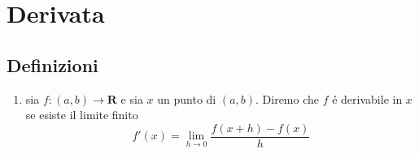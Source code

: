 \documentclass{exam}
\begin{document}
\section{Derivata}
  \subsection{Definizioni}
    \begin{enumerate}
      \item
        sia $f:(a,b)\rightarrow \mathbf{R}$ e sia $x$ un punto di $(a,b)$. Diremo che $f$ \'e derivabile in $x$ se esiste il limite finito
        \begin{equation}
          f'(x)=\lim_{h\to 0}\frac{f(x+h)-f(x)}{h} 
        \end{equation}
    \end{enumerate}
\end{document}
